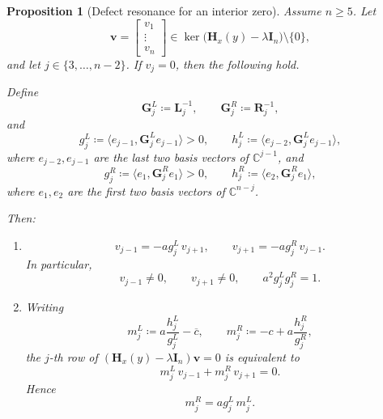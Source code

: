 \documentclass[11pt]{article}
\newtheorem{proposition}[theorem]{Proposition}
\begin{document}
\begin{proposition}[Defect resonance for an interior zero]\label{prop:defect-resonance-final}
Assume \(n\ge 5\). Let
\[
\mathbf v=
\begin{bmatrix}
v_1\\ \vdots\\ v_n
\end{bmatrix}\in \ker\bigl(\mathbf H_x(y)-\lambda\mathbf I_n\bigr)\setminus\{0\},
\]
and let \(j\in\{3,\dots,n-2\}\). If \(v_j=0\), then the following hold.

Define
\[
\mathbf G_j^L\coloneqq \mathbf L_j^{-1},
\qquad
\mathbf G_j^R\coloneqq \mathbf R_j^{-1},
\]
and
\[
g_j^L\coloneqq \bigl\langle e_{j-1},\mathbf G_j^L e_{j-1}\bigr\rangle>0,
\qquad
h_j^L\coloneqq \bigl\langle e_{j-2},\mathbf G_j^L e_{j-1}\bigr\rangle,
\]
where \(e_{j-2},e_{j-1}\) are the last two basis vectors of \(\mathbb C^{j-1}\), and
\[
g_j^R\coloneqq \bigl\langle e_1,\mathbf G_j^R e_1\bigr\rangle>0,
\qquad
h_j^R\coloneqq \bigl\langle e_2,\mathbf G_j^R e_1\bigr\rangle,
\]
where \(e_1,e_2\) are the first two basis vectors of \(\mathbb C^{n-j}\).

Then:
\begin{enumerate}
\item
\[
v_{j-1}=-a g_j^L\,v_{j+1},
\qquad
v_{j+1}=-a g_j^R\,v_{j-1}.
\]
In particular,
\[
v_{j-1}\neq 0,\qquad v_{j+1}\neq 0,
\qquad
a^2 g_j^L g_j^R=1.
\]

\item Writing
\[
m_j^L\coloneqq a\frac{h_j^L}{g_j^L}-\overline c,
\qquad
m_j^R\coloneqq -c+a\frac{h_j^R}{g_j^R},
\]
the \(j\)-th row of \((\mathbf H_x(y)-\lambda\mathbf I_n)\mathbf v=0\) is equivalent to
\[
m_j^L\,v_{j-1}+m_j^R\,v_{j+1}=0.
\]
Hence
\[
\boxed{
m_j^R=a g_j^L\,m_j^L.
}
\]
\end{enumerate}
\end{proposition}
\end{document}
